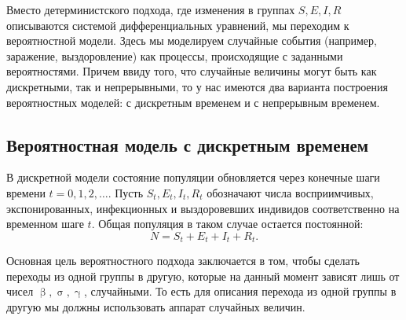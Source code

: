 \documentclass[a4paper, 14pt]{extreport}
\renewcommand{\beta}{\upbeta}
\renewcommand{\gamma}{\upgamma}
\renewcommand{\sigma}{\upsigma}
\begin{document}
	Вместо детерминистского подхода, где изменения в группах $S, E, I, R$ описываются системой дифференциальных уравнений, мы переходим к вероятностной модели. Здесь мы моделируем случайные события (например, заражение, выздоровление) как процессы, происходящие с заданными вероятностями. Причем ввиду того, что случайные величины могут быть как дискретными, так и непрерывными, то у нас имеются два варианта построения вероятностных моделей: с дискретным временем и с непрерывным временем.
	
	\subsection{Вероятностная модель с дискретным временем}
	В дискретной модели состояние популяции обновляется через конечные шаги времени 
	$t=0,1,2,\ldots$. Пусть $S_t, E_t, I_t, R_t$
	обозначают числа восприимчивых, экспонированных, инфекционных и выздоровевших индивидов соответственно на временном шаге $t$. Общая популяция в таком случае остается постоянной:
	$$N = S_t + E_t + I_t + R_t.$$
	
	Основная цель вероятностного подхода заключается в том, чтобы сделать переходы из одной группы в другую, которые на данный момент зависят лишь от чисел $\beta, \sigma,\gamma$, случайными. То есть для описания перехода из одной группы в другую мы должны использовать аппарат случайных величин.
	
\end{document}
